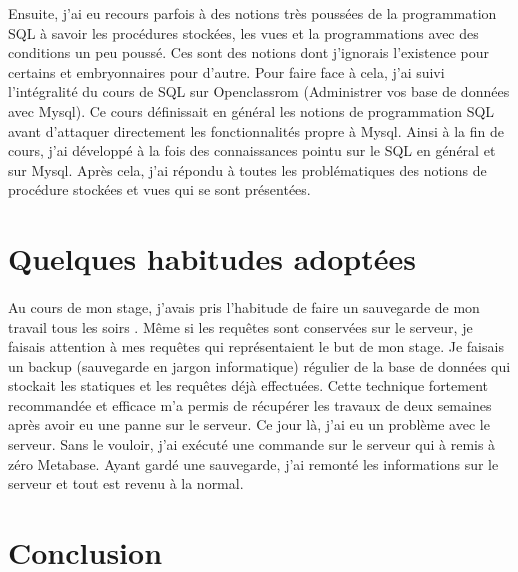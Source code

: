 \documentclass[a4paper,12pt]{report}
\begin{document}
       Ensuite, j’ai eu recours parfois à des notions très poussées de la programmation SQL à savoir les procédures stockées, les vues et la programmations avec des conditions un peu poussé. Ces sont des notions dont j’ignorais l'existence pour certains et embryonnaires  pour  d’autre.
       Pour faire face à cela, j’ai suivi l'intégralité du cours  de SQL  sur Openclassrom (Administrer vos base de données avec Mysql). Ce cours définissait en général les notions de programmation SQL avant d’attaquer directement les  fonctionnalités propre à Mysql. Ainsi à la fin de cours, j’ai développé à la fois des connaissances pointu sur le SQL en général et sur Mysql.
       Après cela, j’ai répondu à toutes les problématiques des notions de procédure stockées et vues qui se sont présentées.

\section{Quelques habitudes adoptées}

\paragraph*{}
       Au cours de mon stage, j’avais pris l’habitude de faire un sauvegarde de mon travail tous les soirs . Même si les requêtes sont conservées  sur le serveur, je faisais attention à mes requêtes qui représentaient le but de mon stage.\newline 
       Je faisais un backup (sauvegarde en jargon informatique) régulier de la base de données qui stockait  les statiques et les requêtes déjà effectuées.\newline 
       Cette technique fortement recommandée et efficace m’a permis de récupérer les travaux de deux semaines après avoir eu une panne sur le serveur. Ce jour là, j’ai eu un problème avec le serveur. Sans le vouloir, j’ai exécuté une commande sur le serveur qui à remis à zéro Metabase. Ayant gardé une sauvegarde, j’ai remonté les informations sur le serveur et tout est revenu à la normal.     

\section{Conclusion}
\paragraph*{}
\end{document}
